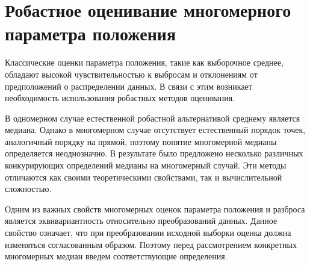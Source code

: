 



\section{Робастное оценивание многомерного параметра положения}

Классические оценки параметра положения, такие как выборочное среднее, обладают высокой чувствительностью к выбросам и отклонениям от предположений о распределении данных. В связи с этим возникает необходимость использования робастных методов оценивания.

В одномерном случае естественной робастной альтернативой среднему является медиана. Однако в многомерном случае отсутствует естественный порядок точек, аналогичный порядку на прямой, поэтому понятие многомерной медианы определяется неоднозначно. В результате было предложено несколько различных конкурирующих определений медианы на многомерный случай. Эти методы отличаются как своими теоретическими свойствами, так и вычислительной сложностью.

Одним из важных свойств многомерных оценок параметра положения и разброса является эквивариантность относительно преобразований данных. Данное свойство означает, что при преобразовании исходной выборки оценка должна изменяться согласованным образом. Поэтому перед рассмотрением конкретных многомерных медиан введем соответствующие определения.

